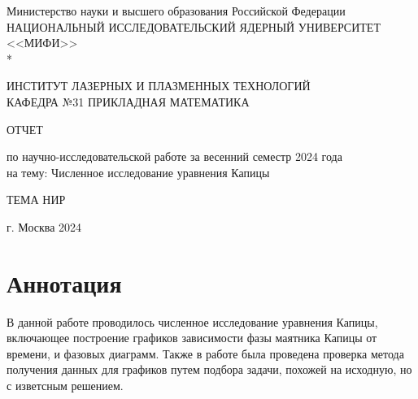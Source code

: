\documentclass[a4paper,12pt]{article}
\begin{document}
		\renewcommand{\contentsname}{\Large Содержание}
		\renewcommand{\bibname}{\normalfont\Large\bfseries Список литературы}
		
		\begin{titlepage}
			\begin{center}
				Министерство науки и высшего образования Российской Федерации \\
				НАЦИОНАЛЬНЫЙ ИССЛЕДОВАТЕЛЬСКИЙ ЯДЕРНЫЙ УНИВЕРСИТЕТ <<МИФИ>> \\*
				\hrulefill
			\end{center}
		
		\begin{center}
			ИНСТИТУТ ЛАЗЕРНЫХ И ПЛАЗМЕННЫХ ТЕХНОЛОГИЙ\\
			КАФЕДРА №31 ПРИКЛАДНАЯ МАТЕМАТИКА
		\end{center}
		\vspace{1cm}
		
		\vspace{2em}
		
		\begin{center}
			\large{ОТЧЕТ}
			
			по научно-исследовательской работе
			за весенний семестр 2024 года \\
			
			на тему: Численное исследование уравнения Капицы
		\end{center}
		
		\begin{center}
			\large ТЕМА НИР
		\end{center}
	
	

\vspace{32em}
		
		\begin{center}
			г. Москва 2024
		\end{center}
	\end{titlepage}

	\newpage 
	\tableofcontents
	\setcounter{page}{3}
	
	\newpage
	\section*{Аннотация}
	
	В данной работе проводилось численное исследование уравнения Капицы, 
	включающее построение графиков зависимости фазы маятника Капицы от времени,
	и фазовых диаграмм. Также в работе была проведена проверка метода
	получения данных для графиков путем подбора задачи, похожей на исходную, 
	но с изветсным решением.
	
\end{document}
